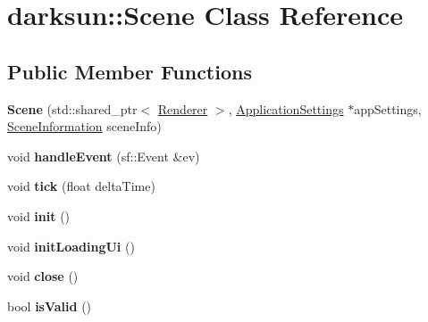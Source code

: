 \hypertarget{classdarksun_1_1_scene}{}\section{darksun\+::Scene Class Reference}
\label{classdarksun_1_1_scene}
\subsection*{Public Member Functions}
\begin{DoxyCompactItemize}
\item 
\mbox{\label{classdarksun_1_1_scene_ae5fd2d6588fa33a14b71b7a21bdd22df}} 
{\bfseries Scene} (std\+::shared\+\_\+ptr$<$ \mbox{\hyperlink{classdarksun_1_1_renderer}{Renderer}} $>$, \mbox{\hyperlink{classdarksun_1_1_application_settings}{Application\+Settings}} $\ast$app\+Settings, \mbox{\hyperlink{structdarksun_1_1_scene_information}{Scene\+Information}} scene\+Info)
\item 
\mbox{\label{classdarksun_1_1_scene_a2e24a903e8da52ebd6bcc2be9403ae07}} 
void {\bfseries handle\+Event} (sf\+::\+Event \&ev)
\item 
\mbox{\label{classdarksun_1_1_scene_acc25651700df8a99ac494624e4bbd7d9}} 
void {\bfseries tick} (float delta\+Time)
\item 
\mbox{\label{classdarksun_1_1_scene_abb3b6efc6fdba03cd96436edaf08a967}} 
void {\bfseries init} ()
\item 
\mbox{\label{classdarksun_1_1_scene_a2ff2b4ce3e60dd041ad6c507d4650228}} 
void {\bfseries init\+Loading\+Ui} ()
\item 
\mbox{\label{classdarksun_1_1_scene_a0e43e56ad2195c20887b3e30e590296d}} 
void {\bfseries close} ()
\item 
\mbox{\label{classdarksun_1_1_scene_a788c9a541c947803fdb1e2962a0c6caa}} 
bool {\bfseries is\+Valid} ()
\item 
\mbox{\label{classdarksun_1_1_scene_ab1b9ca9b821a082cfd3d47cb549a7038}} 

\end{DoxyCompactItemize}
